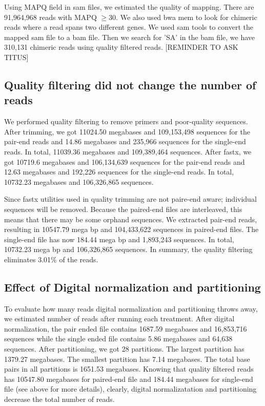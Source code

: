 Using MAPQ field in sam files, we estimated the quality of mapping. There are 91,964,968 reads with MAPQ $\geq 30$. 
We also used bwa mem  \cite{bwa-mem} to look for chimeric reads where a read spans two different genes. We used sam tools to convert the mapped sam file to a bam file. Then we search for ’SA’ in the bam file, we have 310,131 chimeric reads using quality filtered reads. 
[REMINDER TO ASK TITUS]

\subsection*{Quality filtering did not change the number of reads}            
We performed quality filtering to remove primers and poor-quality sequences. After trimming, we got 11024.50 megabases and 109,153,498 sequences for the pair-end reads and 14.86 megabases and 235,966 sequences for the single-end reads. In total,  11039.36 megabases and 109,389,464 sequences. 
After fastx, we got 10719.6 megabases and 106,134,639 sequences for the pair-end reads and 12.63  megabases and 192,226 sequences for the single-end reads. In total, 10732.23 megabases and 106,326,865 sequences. 

Since fastx utilities used in quality trimming are not paire-end aware; individual sequences will be removed. Because the paired-end files are interleaved, this means that there may be some orphand sequences. We extracted pair-end reads, resulting in 10547.79 mega bp and 104,433,622 sequences in paired-end files. The single-end file has now 184.44 mega bp and 1,893,243 sequences. In total, 10732.23 mega bp and 106,326,865 sequences. 
In summary, the quality filtering eliminates 3.01\% of the reads. 

\subsection *{Effect of Digital normalization and partitioning} 
To evaluate how many reads digital normalization and partitioning throws away, we estimated number of reads after running each treatment. 
After digital normalization, the pair ended file contains 1687.59 megabases and 16,853,716 sequences  while the single ended file contains 5.86 megabases and 64,638 sequences. 
After partitioning, we got 28 partitions. The largest partition has 1379.27 megabases. The smallest partition has 7.14 megabases. The total base pairs in all partitions is 1651.53 megabases. 
Knowing that quality filtered reads has 10547.80 megabases for paired-end file and 184.44  megabases for single-end file (see above for more details), clearly, digital normalizatation and partitioning decrease the total number of reads.  


